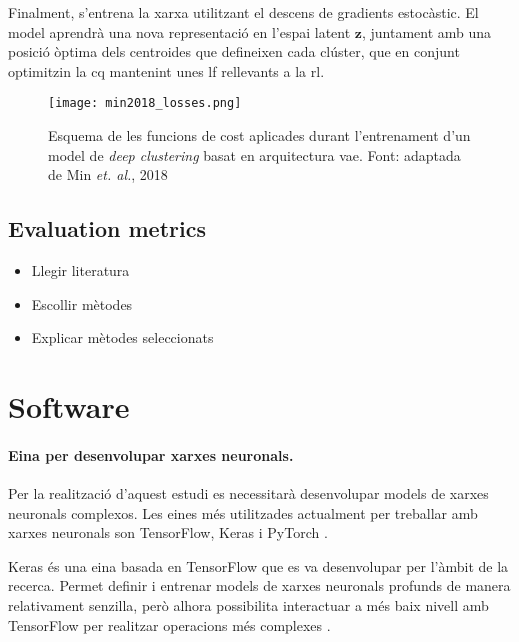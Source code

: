 \documentclass[CAT,BIB]{TFUOC}%
\newcommand{\todo}[1]{
            \begin{tcolorbox}[title=ToDo!, colback=red!5!white, colframe=red!50!black, coltext=red!50!black]
            #1
            \end{tcolorbox}}
\begin{document}
        Finalment, s'entrena la xarxa utilitzant el descens de gradients estocàstic.
        El model aprendrà una nova representació en l'espai latent $\mathbf{z}$,
        juntament amb una posició òptima dels centroides que defineixen cada clúster,
        que en conjunt optimitzin la \gls{cq}
        mantenint unes \gls{lf} rellevants a la \gls{rl}.

        \begin{figure}
            \centering
            \texttt{[image: min2018\_losses.png]}
            \caption{
                Esquema de les funcions de cost
                aplicades durant l'entrenament
                d'un model de \textit{deep clustering}
                basat en arquitectura \gls{vae}.
                Font: adaptada de Min \textit{et. al.}, 2018 \citep{Min2018}
            }
            \label{fig:vae_losses}
        \end{figure}


    \subsection{Evaluation metrics}
    \label{s:metrics}

\todo{
    \begin{itemize}
        \item Llegir literatura
        \item Escollir mètodes
        \item Explicar mètodes seleccionats
    \end{itemize}}
\newpage

    \section{Software}
    \label{s:software}

        \paragraph{Eina per desenvolupar xarxes neuronals.}

            Per la realització d'aquest estudi es necessitarà desenvolupar models de xarxes neuronals complexos. Les eines més utilitzades actualment per treballar amb xarxes neuronals son TensorFlow, Keras i PyTorch \citep{Kaggle2021}.

            Keras \citep{Chollet2015} és una eina basada en TensorFlow \citep{Ghemawat2016} que es va desenvolupar per l'àmbit de la recerca. Permet definir i entrenar models de xarxes neuronals profunds de manera relativament senzilla, però alhora possibilita interactuar a més baix nivell amb TensorFlow per realitzar operacions més complexes \citep{Ketkar2021}.
\end{document}
